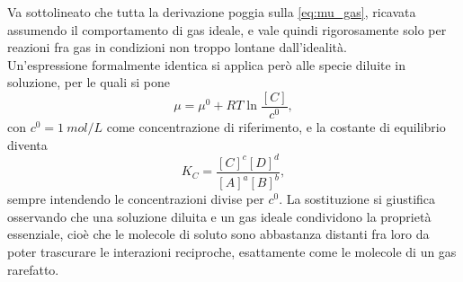 Va sottolineato che tutta la derivazione poggia sulla \eqref{eq:mu_gas}, ricavata assumendo il comportamento di gas ideale, e vale quindi rigorosamente solo per reazioni fra gas in condizioni non troppo lontane dall'idealità.\\

Un'espressione formalmente identica si applica però alle specie diluite in soluzione, per le quali si pone
\begin{equation}
    \mu = \mu^0 + RT\ln\frac{[C]}{c^0} ,
    \label{eq:mu_soluzione}
\end{equation}
con $c^0 = 1 \ mol/L$ come concentrazione di riferimento, e la costante di equilibrio diventa
\begin{equation}
    K_C = \frac{[C]^{c}[D]^{d}}{[A]^{a}[B]^{b}} ,
    \label{eq:KC}
\end{equation}
sempre intendendo le concentrazioni divise per $c^0$.
La sostituzione si giustifica osservando che una soluzione diluita e un gas ideale condividono la proprietà essenziale, cioè che le molecole di soluto sono abbastanza distanti fra loro da poter trascurare le interazioni reciproche, esattamente come le molecole di un gas rarefatto.